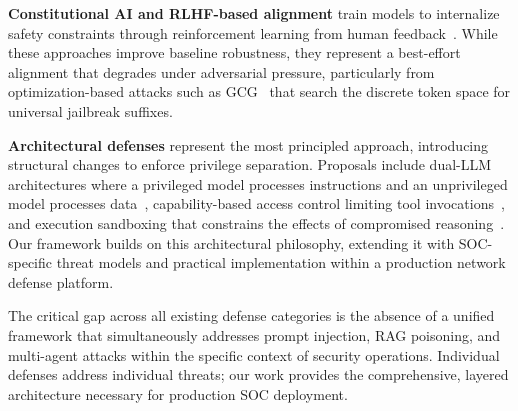 \documentclass[journal,twoside]{IEEEtran}
\begin{document}
\textbf{Constitutional AI and RLHF-based alignment} train models to internalize safety constraints through reinforcement learning from human feedback~\cite{bai2022constitutional}. While these approaches improve baseline robustness, they represent a best-effort alignment that degrades under adversarial pressure, particularly from optimization-based attacks such as GCG~\cite{zou2023universal} that search the discrete token space for universal jailbreak suffixes.

\textbf{Architectural defenses} represent the most principled approach, introducing structural changes to enforce privilege separation. Proposals include dual-LLM architectures where a privileged model processes instructions and an unprivileged model processes data~\cite{chen2024struq}, capability-based access control limiting tool invocations~\cite{wu2024autogen}, and execution sandboxing that constrains the effects of compromised reasoning~\cite{cohen2024multiagent}. Our framework builds on this architectural philosophy, extending it with SOC-specific threat models and practical implementation within a production network defense platform.

The critical gap across all existing defense categories is the absence of a unified framework that simultaneously addresses prompt injection, RAG poisoning, and multi-agent attacks within the specific context of security operations. Individual defenses address individual threats; our work provides the comprehensive, layered architecture necessary for production SOC deployment.

\end{document}
